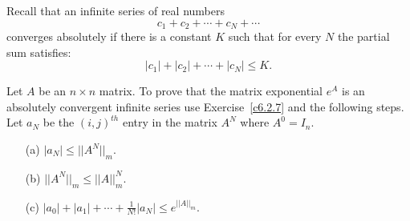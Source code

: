 \documentclass{ximera}
\begin{document}
\begin{exercise} \label{c6.2.8}
Recall that an infinite series of real numbers
\[
c_1+c_2 +\cdots+c_N + \cdots
\]
converges absolutely if there is a constant $K$ such that for every $N$
the partial sum satisfies:
\[
|c_1| + |c_2| + \cdots + |c_N| \leq K.
\]

Let $A$ be an $n\times n$ matrix.  To prove that the matrix exponential $e^A$
is an absolutely convergent infinite series use Exercise~\ref{c6.2.7} and the
following steps.  Let $a_N$ be the $(i,j)^{th}$ entry in the matrix $A^N$
where $A^0=I_n$.
\begin{itemize}
\item[(a)]  $|a_N| \leq ||A^N||_m$.
\item[(b)]  $||A^N||_m \leq ||A||_m^N$.
\item[(c)]  $|a_0| + |a_1| + \cdots + \frac{1}{N!}|a_N| \leq e^{||A||_m}$.
\end{itemize}
\end{exercise}
\end{document}
